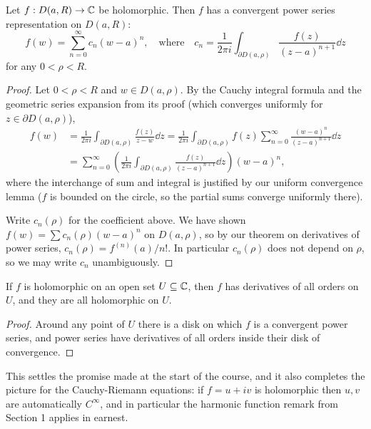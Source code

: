 \documentclass[a4paper]{scrartcl}
\begin{document}
\begin{theorem}
    Let $f: D(a, R) \rightarrow \mathbb{C}$ be holomorphic. Then $f$ has a convergent power series representation on $D(a, R)$:
    $$
    f(w) = \sum_{n = 0}^{\infty} c_n (w - a)^n, \quad \text{where} \quad c_n = \frac{1}{2 \pi i} \int_{\partial D(a, \rho)} \frac{f(z)}{(z - a)^{n + 1}} \dd z
    $$
    for any $0 < \rho < R$.
\end{theorem}
\begin{proof}
    Let $0 < \rho < R$ and $w \in D(a, \rho)$. By the Cauchy integral formula and the geometric series expansion from its proof (which converges uniformly for $z \in \partial D(a, \rho)$),
    \begin{align*}
        f(w) &= \frac{1}{2 \pi i} \int_{\partial D(a, \rho)} \frac{f(z)}{z - w} \dd z
        = \frac{1}{2 \pi i} \int_{\partial D(a, \rho)} f(z) \sum_{n = 0}^{\infty} \frac{(w - a)^n}{(z - a)^{n + 1}} \dd z \\
        &= \sum_{n = 0}^{\infty} \left(\frac{1}{2 \pi i} \int_{\partial D(a, \rho)} \frac{f(z)}{(z - a)^{n + 1}} \dd z \right) (w - a)^n,
    \end{align*}
    where the interchange of sum and integral is justified by our uniform convergence lemma ($f$ is bounded on the circle, so the partial sums converge uniformly there).

    Write $c_n(\rho)$ for the coefficient above. We have shown $f(w) = \sum c_n(\rho) (w - a)^n$ on $D(a, \rho)$, so by our theorem on derivatives of power series, $c_n(\rho) = f^{(n)}(a)/n!$. In particular $c_n(\rho)$ does not depend on $\rho$, so we may write $c_n$ unambiguously.
\end{proof}

\begin{corollary}
    If $f$ is holomorphic on an open set $U \subseteq \mathbb{C}$, then $f$ has derivatives of all orders on $U$, and they are all holomorphic on $U$.
\end{corollary}
\begin{proof}
    Around any point of $U$ there is a disk on which $f$ is a convergent power series, and power series have derivatives of all orders inside their disk of convergence.
\end{proof}

This settles the promise made at the start of the course, and it also completes the picture for the Cauchy-Riemann equations: if $f = u + iv$ is holomorphic then $u, v$ are automatically $C^\infty$, and in particular the harmonic function remark from Section 1 applies in earnest.
\end{document}
